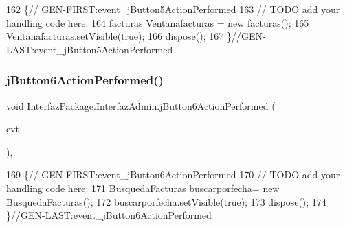 \begin{DoxyCode}
162                                                                          \{\textcolor{comment}{//
      GEN-FIRST:event\_jButton5ActionPerformed}
163         \textcolor{comment}{// TODO add your handling code here:}
164         facturas Ventanafacturas = \textcolor{keyword}{new} facturas();
165         Ventanafacturas.setVisible(\textcolor{keyword}{true});
166         dispose();
167     \}\textcolor{comment}{//GEN-LAST:event\_jButton5ActionPerformed}
\end{DoxyCode}
\mbox{\label{class_interfaz_package_1_1_interfaz_admin_ad3610dff3e28f93647357a5ba251d465}} 
\subsubsection{\texorpdfstring{j\+Button6\+Action\+Performed()}{jButton6ActionPerformed()}}
{\footnotesize\ttfamily void Interfaz\+Package.\+Interfaz\+Admin.\+j\+Button6\+Action\+Performed (\begin{DoxyParamCaption}\item[{java.\+awt.\+event.\+Action\+Event}]{evt }\end{DoxyParamCaption})\hspace{0.3cm}{\ttfamily [inline]}, {\ttfamily [private]}}


\begin{DoxyCode}
169                                                                          \{\textcolor{comment}{//
      GEN-FIRST:event\_jButton6ActionPerformed}
170         \textcolor{comment}{// TODO add your handling code here:}
171         BusquedaFacturas buscarporfecha= \textcolor{keyword}{new} BusquedaFacturas();
172         buscarporfecha.setVisible(\textcolor{keyword}{true});
173         dispose();
174     \}\textcolor{comment}{//GEN-LAST:event\_jButton6ActionPerformed}
\end{DoxyCode}
\mbox{\label{class_interfaz_package_1_1_interfaz_admin_a496951852701837eedb332a25d7e50ef}} 
